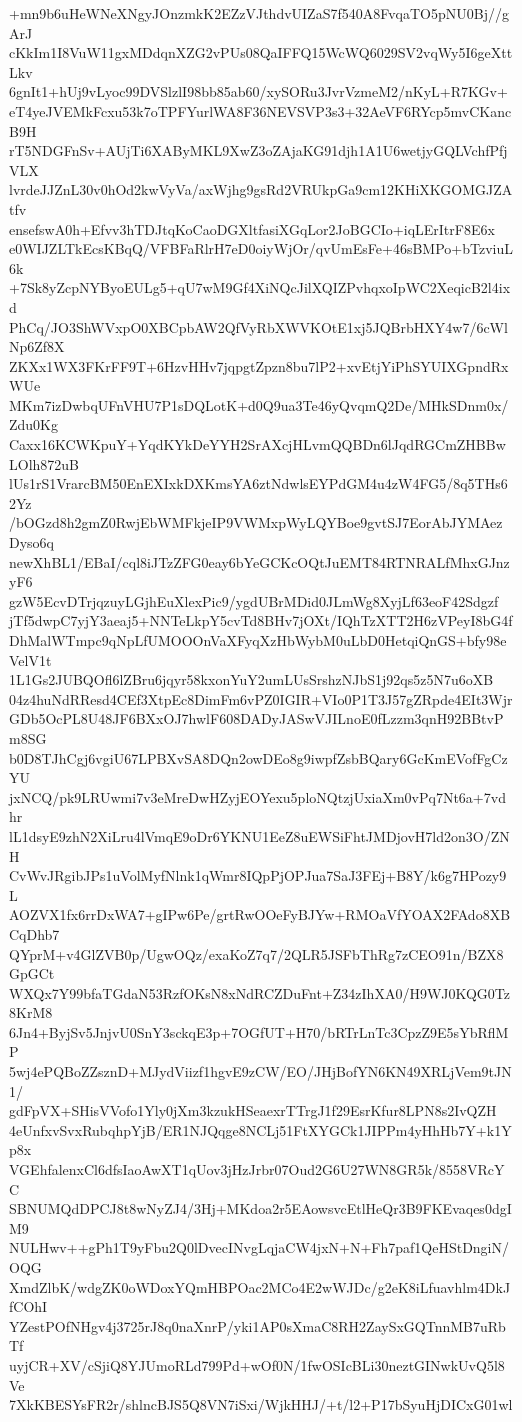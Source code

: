 +mn9b6uHeWNeXNgyJOnzmkK2EZzVJthdvUIZaS7f540A8FvqaTO5pNU0Bj//gArJ
cKkIm1I8VuW11gxMDdqnXZG2vPUs08QaIFFQ15WcWQ6029SV2vqWy5I6geXttLkv
6gnIt1+hUj9vLyoc99DVSlzlI98bb85ab60/xySORu3JvrVzmeM2/nKyL+R7KGv+
eT4yeJVEMkFcxu53k7oTPFYurlWA8F36NEVSVP3s3+32AeVF6RYcp5mvCKancB9H
rT5NDGFnSv+AUjTi6XAByMKL9XwZ3oZAjaKG91djh1A1U6wetjyGQLVchfPfjVLX
lvrdeJJZnL30v0hOd2kwVyVa/axWjhg9gsRd2VRUkpGa9cm12KHiXKGOMGJZAtfv
ensefswA0h+Efvv3hTDJtqKoCaoDGXltfasiXGqLor2JoBGCIo+iqLErItrF8E6x
e0WIJZLTkEcsKBqQ/VFBFaRlrH7eD0oiyWjOr/qvUmEsFe+46sBMPo+bTzviuL6k
+7Sk8yZcpNYByoEULg5+qU7wM9Gf4XiNQcJilXQIZPvhqxoIpWC2XeqicB2l4ixd
PhCq/JO3ShWVxpO0XBCpbAW2QfVyRbXWVKOtE1xj5JQBrbHXY4w7/6cWlNp6Zf8X
ZKXx1WX3FKrFF9T+6HzvHHv7jqpgtZpzn8bu7lP2+xvEtjYiPhSYUIXGpndRxWUe
MKm7izDwbqUFnVHU7P1sDQLotK+d0Q9ua3Te46yQvqmQ2De/MHkSDnm0x/Zdu0Kg
Caxx16KCWKpuY+YqdKYkDeYYH2SrAXcjHLvmQQBDn6lJqdRGCmZHBBwLOlh872uB
lUs1rS1VrarcBM50EnEXIxkDXKmsYA6ztNdwlsEYPdGM4u4zW4FG5/8q5THs62Yz
/bOGzd8h2gmZ0RwjEbWMFkjeIP9VWMxpWyLQYBoe9gvtSJ7EorAbJYMAezDyso6q
newXhBL1/EBaI/cql8iJTzZFG0eay6bYeGCKcOQtJuEMT84RTNRALfMhxGJnzyF6
gzW5EcvDTrjqzuyLGjhEuXlexPic9/ygdUBrMDid0JLmWg8XyjLf63eoF42Sdgzf
jTf5dwpC7yjY3aeaj5+NNTeLkpY5cvTd8BHv7jOXt/IQhTzXTT2H6zVPeyI8bG4f
DhMalWTmpc9qNpLfUMOOOnVaXFyqXzHbWybM0uLbD0HetqiQnGS+bfy98eVelV1t
1L1Gs2JUBQOfl6lZBru6jqyr58kxonYuY2umLUsSrshzNJbS1j92qs5z5N7u6oXB
04z4huNdRResd4CEf3XtpEc8DimFm6vPZ0IGIR+VIo0P1T3J57gZRpde4EIt3Wjr
GDb5OcPL8U48JF6BXxOJ7hwlF608DADyJASwVJILnoE0fLzzm3qnH92BBtvPm8SG
b0D8TJhCgj6vgiU67LPBXvSA8DQn2owDEo8g9iwpfZsbBQary6GcKmEVofFgCzYU
jxNCQ/pk9LRUwmi7v3eMreDwHZyjEOYexu5ploNQtzjUxiaXm0vPq7Nt6a+7vdhr
lL1dsyE9zhN2XiLru4lVmqE9oDr6YKNU1EeZ8uEWSiFhtJMDjovH7ld2on3O/ZNH
CvWvJRgibJPs1uVolMyfNlnk1qWmr8IQpPjOPJua7SaJ3FEj+B8Y/k6g7HPozy9L
AOZVX1fx6rrDxWA7+gIPw6Pe/grtRwOOeFyBJYw+RMOaVfYOAX2FAdo8XBCqDhb7
QYprM+v4GlZVB0p/UgwOQz/exaKoZ7q7/2QLR5JSFbThRg7zCEO91n/BZX8GpGCt
WXQx7Y99bfaTGdaN53RzfOKsN8xNdRCZDuFnt+Z34zIhXA0/H9WJ0KQG0Tz8KrM8
6Jn4+ByjSv5JnjvU0SnY3sckqE3p+7OGfUT+H70/bRTrLnTc3CpzZ9E5sYbRflMP
5wj4ePQBoZZsznD+MJydViizf1hgvE9zCW/EO/JHjBofYN6KN49XRLjVem9tJN1/
gdFpVX+SHisVVofo1Yly0jXm3kzukHSeaexrTTrgJ1f29EsrKfur8LPN8s2IvQZH
4eUnfxvSvxRubqhpYjB/ER1NJQqge8NCLj51FtXYGCk1JIPPm4yHhHb7Y+k1Yp8x
VGEhfalenxCl6dfsIaoAwXT1qUov3jHzJrbr07Oud2G6U27WN8GR5k/8558VRcYC
SBNUMQdDPCJ8t8wNyZJ4/3Hj+MKdoa2r5EAowsvcEtlHeQr3B9FKEvaqes0dgIM9
NULHwv++gPh1T9yFbu2Q0lDvecINvgLqjaCW4jxN+N+Fh7paf1QeHStDngiN/OQG
XmdZlbK/wdgZK0oWDoxYQmHBPOac2MCo4E2wWJDc/g2eK8iLfuavhlm4DkJfCOhI
YZestPOfNHgv4j3725rJ8q0naXnrP/yki1AP0sXmaC8RH2ZaySxGQTnnMB7uRbTf
uyjCR+XV/cSjiQ8YJUmoRLd799Pd+wOf0N/1fwOSIcBLi30neztGINwkUvQ5l8Ve
7XkKBESYsFR2r/shlncBJS5Q8VN7iSxi/WjkHHJ/+t/l2+P17bSyuHjDICxG01wl
